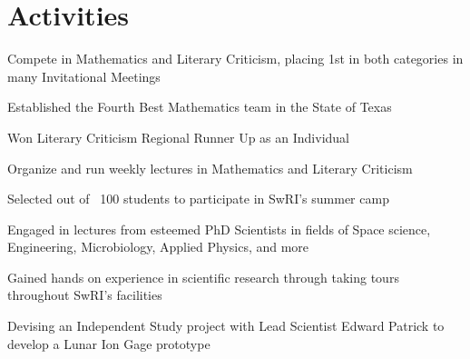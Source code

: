 \documentclass[letterpaper]{kathy-resume} %
\begin{document}
\hfill
%
%
\begin{minipage}[t]{0.64\textwidth} %


\section{Activities}


\vspace{\topsep} %
\begin{tightitemize}
\item Compete in Mathematics and Literary Criticism, placing 1st in both categories in many Invitational Meetings 
\item Established the Fourth Best Mathematics team in the State of Texas
\item Won Literary Criticism Regional Runner Up as an Individual
\item Organize and run weekly lectures in Mathematics and Literary Criticism
\end{tightitemize}

\sectionspace %





\begin{tightitemize}
\item Selected out of ~100 students to participate in SwRI's summer camp 
\item  Engaged in lectures from esteemed PhD Scientists in fields of Space science,
Engineering, Microbiology, Applied Physics, and more
\item Gained hands on experience in scientific research through taking tours throughout SwRI’s facilities 
\item Devising an Independent Study project with Lead Scientist Edward Patrick to develop a Lunar Ion Gage prototype
\end{tightitemize}


\end{minipage}
\end{document}
